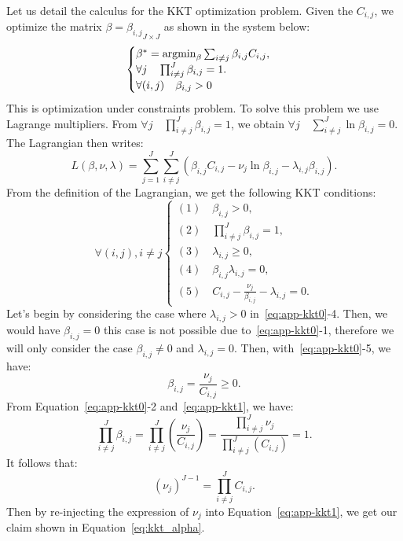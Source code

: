 \medskip 

Let us detail the calculus for the KKT optimization problem. 
Given the $C_{i,j}$, we  optimize the matrix $\beta = {\beta_{i,j}}_{J \times J}$ as shown in the system below:
\begin{equation}
\begin{cases}
\beta^* =  \operatornamewithlimits{argmin}_{\beta}  \sum_{i \neq j} \beta_{i,j}  C _{i,j} ,      \\
\forall j \quad \prod_{i \neq j}^J \beta_{i,j}  = 1. \\
\forall (i,j) \quad \beta_{i,j} >   0 \\      
\end{cases} 
\label{eq:KKT0-app}
\end{equation} 
This is optimization under constraints problem. To solve this problem  we use Lagrange multipliers.
From   $\forall j \quad \prod_{i \neq j}^J \beta_{i,j}  = 1$, we obtain
$\forall j \quad \sum_{i \neq j}^J \ln  \beta_{i,j}   = 0$. The Lagrangian then writes: 
\begin{equation}
L(\beta,\nu,\lambda)=\sum_{j=1}^J  \sum_{i \neq j}^J ( \beta_{i,j}  C _{i,j}    - \nu_j  \ln  \beta_{i,j}  - \lambda_{i,j}   \beta_{i,j} ).
\label{eq:Lag-KKT}
\end{equation}
From the definition of the Lagrangian, we get the following KKT conditions:
\begin{equation}
\forall (i,j), i \neq j
\begin{cases}
(1) \quad \beta_{i,j} > 0,   \\
(2) \quad \prod_{i \neq j}^J \beta_{i,j}  = 1,  \\
(3) \quad \lambda_{i,j} \geq 0,  \\
(4) \quad \beta_{i,j}  \lambda_{i,j} = 0,   \\
(5) \quad  C _{i,j}       -  \frac{\nu_j}{ \beta_{i,j} }   - \lambda_{i,j} = 0.
\end{cases} 
\label{eq:app-kkt0}
\end{equation} 
Let's begin by considering the case where $\lambda_{i,j} > 0$ in~\eqref{eq:app-kkt0}-4. Then, we would have $\beta_{i,j}=0$  this case is not possible due to~\eqref{eq:app-kkt0}-1, therefore we will only consider the case $\beta_{i,j} \neq 0$ and $\lambda_{i,j}=0$. Then, with~\eqref{eq:app-kkt0}-5, we have:
\begin{equation}
\beta_{i,j}  =   \frac{\nu_j} { C _{i,j} } \geq 0.
\label{eq:app-kkt1}
\end{equation}
From Equation~\eqref{eq:app-kkt0}-2 and~\eqref{eq:app-kkt1}, we have:
\begin{equation}
\prod_{i \neq j}^J   \beta_{i,j}  = \prod_{i \neq j}^J  \left(\frac{\nu_j}{C _{i,j} } \right)=\frac{\prod_{i \neq j}^J \nu_j} { \prod_{i \neq j}^J  \left( {C _{i,j} } \right)}  =1.
\end{equation}
It follows that:
$$
{(\nu_j)}^{J-1}  =     \prod_{i \neq j}^J   C _{i,j} . 
$$
Then by re-injecting the expression of $\nu_j$ into Equation~\eqref{eq:app-kkt1}, we get our claim  shown in Equation~\eqref{eq:kkt_alpha}.

